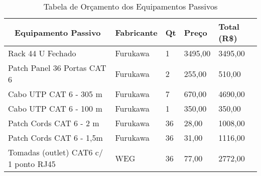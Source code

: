 \begin{table}[h!]
\centering
	\begin{tabular}{|l|l|l|l|l|}
		\hline
		\multicolumn{1}{|c|}{\textbf{Equipamento Passivo}} & \multicolumn{1}{c|}{\textbf{Fabricante}} & \multicolumn{1}{c|}{\textbf{Qt}} & \textbf{Preço} & \textbf{Total (R\$)} \\ \hline
		Rack 44 U Fechado                                  & Furukawa                                 & 1                                & 3495,00        & 3495,00              \\ \hline
		Patch Panel 36 Portas CAT 6                        & Furukawa                                 & 2                                & 255,00         & 510,00               \\ \hline
		Cabo UTP CAT 6 - 305 m                             & Furukawa                                 & 7                                & 670,00         & 4690,00              \\ \hline
		Cabo UTP CAT 6 - 100 m                             & Furukawa                                 & 1                                & 350,00         & 350,00               \\ \hline
		Patch Cords CAT 6 - 2 m                            & Furukawa                                 & 36                               & 28,00          & 1008,00              \\ \hline
		Patch Cords CAT 6 - 1,5m                           & Furukawa                                 & 36                               & 31,00          & 1116,00              \\ \hline
		Tomadas (outlet) CAT6 c/ 1 ponto RJ45              & WEG                                      & 36                               & 77,00          & 2772,00              \\ \hline
	\end{tabular}
\caption{Tabela de Orçamento dos Equipamentos Passivos}
\label{tab:orcPassivos}
\end{table}